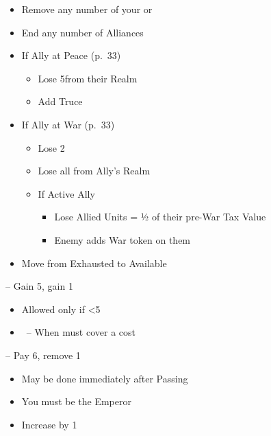 \documentclass[10pt]{article}
\begin{document}
\begin{itemize}
	\item Remove any number of your \influence or \claims
	\item End any number of Alliances
	\item If Ally at Peace (p.~33)
	\begin{itemize}
		\item Lose 5\influence from their Realm
		\item Add Truce
	\end{itemize}
	\item If Ally at War (p.~33)
	\begin{itemize}
		\item Lose 2\stability
		\item Lose all \influence from Ally's Realm
		\item If Active Ally
		\begin{itemize}
			\item Lose Allied Units = ½ of their pre-War Tax Value
			\item Enemy adds War token on them
		\end{itemize}
	\end{itemize}
\end{itemize}

\begin{itemize}
	\item Move \manpower from Exhausted to Available
\end{itemize}

 -- Gain 5\ducats, gain 1\interest
\begin{itemize}
	\item Allowed only if <5\interest
	\item \reaction~-- When must cover a cost
\end{itemize}
 -- Pay 6\ducats, remove 1\interest
\begin{itemize}
	\item May be done immediately after Passing
\end{itemize}

\begin{itemize}
	\item You must be the Emperor
	\item Increase \authority by 1
\end{itemize}
\end{document}
